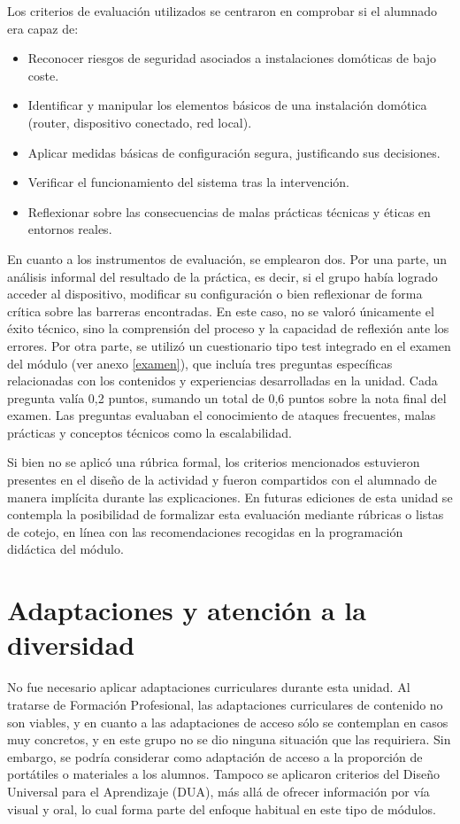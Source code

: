 Los criterios de evaluación utilizados se centraron en comprobar si el alumnado era capaz de:

\begin{itemize}
  \item Reconocer riesgos de seguridad asociados a instalaciones domóticas de bajo coste.
  \item Identificar y manipular los elementos básicos de una instalación domótica (router, dispositivo conectado, red local).
  \item Aplicar medidas básicas de configuración segura, justificando sus decisiones.
  \item Verificar el funcionamiento del sistema tras la intervención.
  \item Reflexionar sobre las consecuencias de malas prácticas técnicas y éticas en entornos reales.
\end{itemize}

En cuanto a los instrumentos de evaluación, se emplearon dos. Por una parte, un análisis informal del resultado de la práctica, es decir, si el grupo había logrado acceder al dispositivo, modificar su configuración o bien reflexionar de forma crítica sobre las barreras encontradas. En este caso, no se valoró únicamente el éxito técnico, sino la comprensión del proceso y la capacidad de reflexión ante los errores. Por otra parte, se utilizó un cuestionario tipo test integrado en el examen del módulo (ver anexo \ref{examen}), que incluía tres preguntas específicas relacionadas con los contenidos y experiencias desarrolladas en la unidad. Cada pregunta valía 0,2 puntos, sumando un total de 0,6 puntos sobre la nota final del examen. Las preguntas evaluaban el conocimiento de ataques frecuentes, malas prácticas y conceptos técnicos como la escalabilidad.

Si bien no se aplicó una rúbrica formal, los criterios mencionados estuvieron presentes en el diseño de la actividad y fueron compartidos con el alumnado de manera implícita durante las explicaciones. En futuras ediciones de esta unidad se contempla la posibilidad de formalizar esta evaluación mediante rúbricas o listas de cotejo, en línea con las recomendaciones recogidas en la programación didáctica del módulo.


\section{Adaptaciones y atención a la diversidad}

No fue necesario aplicar adaptaciones curriculares durante esta unidad. Al tratarse de Formación Profesional, las adaptaciones curriculares de contenido no son viables, y en cuanto a las adaptaciones de acceso sólo se contemplan en casos muy concretos, y en este grupo no se dio ninguna situación que las requiriera. Sin embargo, se podría considerar como adaptación de acceso a la proporción de portátiles o materiales a los alumnos.
Tampoco se aplicaron criterios del Diseño Universal para el Aprendizaje (DUA), más allá de ofrecer información por vía visual y oral, lo cual forma parte del enfoque habitual en este tipo de módulos.
